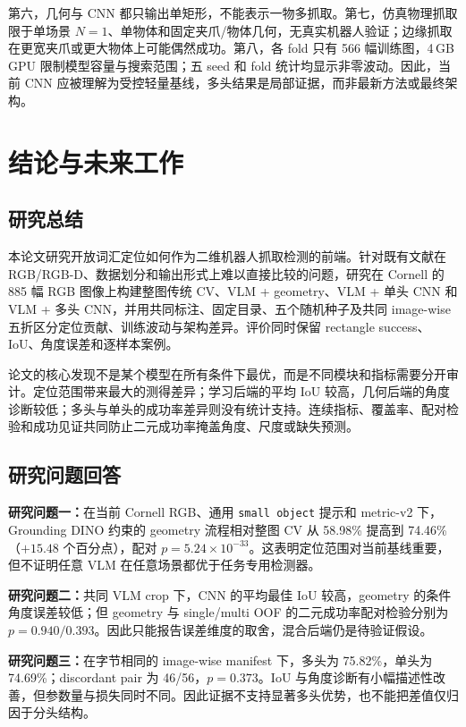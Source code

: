 \documentclass{l4proj}
\begin{document}
第六，几何与 CNN 都只输出单矩形，不能表示一物多抓取。第七，仿真物理抓取限于单场景 $N=1$、单物体和固定夹爪/物体几何，无真实机器人验证；边缘抓取在更宽夹爪或更大物体上可能偶然成功。第八，各 fold 只有 566 幅训练图，4\,GB GPU 限制模型容量与搜索范围；五 seed 和 fold 统计均显示非零波动。因此，当前 CNN 应被理解为受控轻量基线，多头结果是局部证据，而非最新方法或最终架构。

\chapter{结论与未来工作}

\section{研究总结}
本论文研究开放词汇定位如何作为二维机器人抓取检测的前端。针对既有文献在 RGB/RGB-D、数据划分和输出形式上难以直接比较的问题，研究在 Cornell 的 885 幅 RGB 图像上构建整图传统 CV、VLM + geometry、VLM + 单头 CNN 和 VLM + 多头 CNN，并用共同标注、固定目录、五个随机种子及共同 image-wise 五折区分定位贡献、训练波动与架构差异。评价同时保留 rectangle success、IoU、角度误差和逐样本案例。

论文的核心发现不是某个模型在所有条件下最优，而是不同模块和指标需要分开审计。定位范围带来最大的测得差异；学习后端的平均 IoU 较高，几何后端的角度诊断较低；多头与单头的成功率差异则没有统计支持。连续指标、覆盖率、配对检验和成功见证共同防止二元成功率掩盖角度、尺度或缺失预测。

\section{研究问题回答}
\textbf{研究问题一：}在当前 Cornell RGB、通用 \texttt{small object} 提示和 metric-v2 下，Grounding DINO 约束的 geometry 流程相对整图 CV 从 58.98\% 提高到 74.46\%（$+15.48$ 个百分点），配对 $p=5.24\times10^{-33}$。这表明定位范围对当前基线重要，但不证明任意 VLM 在任意场景都优于任务专用检测器。

\textbf{研究问题二：}共同 VLM crop 下，CNN 的平均最佳 IoU 较高，geometry 的条件角度误差较低；但 geometry 与 single/multi OOF 的二元成功率配对检验分别为 $p=0.940/0.393$。因此只能报告误差维度的取舍，混合后端仍是待验证假设。

\textbf{研究问题三：}在字节相同的 image-wise manifest 下，多头为 75.82\%，单头为 74.69\%；discordant pair 为 46/56，$p=0.373$。IoU 与角度诊断有小幅描述性改善，但参数量与损失同时不同。因此证据不支持显著多头优势，也不能把差值仅归因于分头结构。
\end{document}
